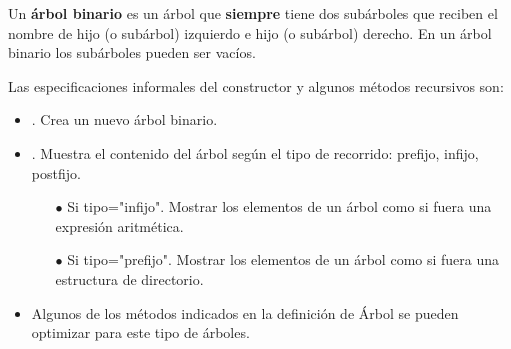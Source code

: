 


\begin{definicion}{}  \label{def:arbolBinario}
Un \textbf{árbol binario} es un árbol que \textbf{siempre} tiene dos subárboles que reciben el nombre de hijo (o subárbol) izquierdo e hijo (o subárbol) derecho. En un árbol binario los subárboles pueden ser vacíos.

\noindent Las especificaciones informales del constructor y algunos métodos recursivos son:


\begin{itemize}
\item {}. Crea un nuevo árbol binario.

\item {}.  Muestra el contenido del árbol según el tipo de recorrido: prefijo, infijo, postfijo.
	\begin{itemize}
	\item[$\bullet$] Si tipo="\/infijo".  Mostrar los elementos de un árbol como si fuera una expresión aritmética.
	\item[$\bullet$] Si tipo="prefijo".  Mostrar los elementos de un árbol como si fuera una estructura de directorio.
	\end{itemize}

\item Algunos de los métodos indicados en la definición de Árbol se pueden optimizar para este tipo de árboles.
\end{itemize}

\end{definicion}

